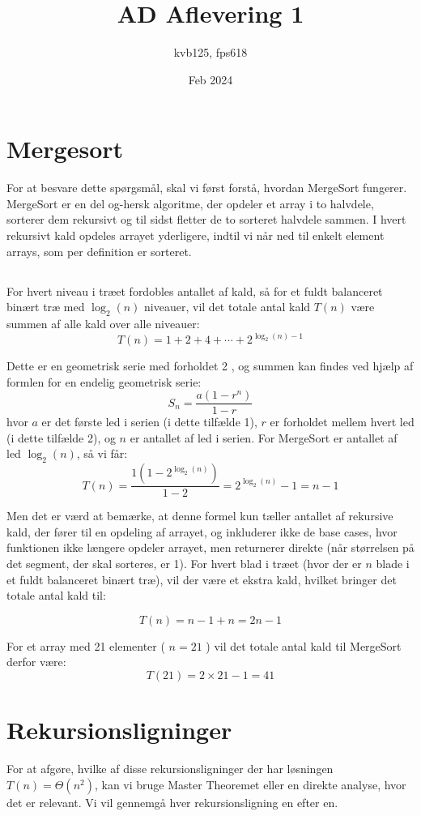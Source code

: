 \documentclass{article}
\title{AD Aflevering 1}
\author{kvb125, fps618}
\date{Feb 2024}
\begin{document}
\maketitle

\section{Mergesort}
For at besvare dette spørgsmål, skal vi først forstå, hvordan MergeSort fungerer. MergeSort er en del og-hersk algoritme, der opdeler et array i to halvdele, sorterer dem rekursivt og til sidst fletter de to sorteret halvdele sammen. I hvert rekursivt kald opdeles arrayet yderligere, indtil vi når ned til enkelt element arrays, som per definition er sorteret.

\subsection{}

For hvert niveau i træet fordobles antallet af kald, så for et fuldt balanceret binært træ med $\log _2(n)$ niveauer, vil det totale antal kald $T(n)$ være summen af alle kald over alle niveauer:
$$
T(n)=1+2+4+\cdots+2^{\log _2(n)-1}
$$

Dette er en geometrisk serie med forholdet 2 , og summen kan findes ved hjælp af formlen for en endelig geometrisk serie:
$$
S_n=\frac{a\left(1-r^n\right)}{1-r}
$$
hvor $a$ er det første led i serien (i dette tilfælde 1), $r$ er forholdet mellem hvert led (i dette tilfælde 2), og $n$ er antallet af led i serien. For MergeSort er antallet af led $\log _2(n)$, så vi får:
$$
T(n)=\frac{1\left(1-2^{\log _2(n)}\right)}{1-2}=2^{\log _2(n)}-1=n-1
$$

Men det er værd at bemærke, at denne formel kun tæller antallet af rekursive kald, der fører til en opdeling af arrayet, og inkluderer ikke de base cases, hvor funktionen ikke længere opdeler arrayet, men returnerer direkte (når størrelsen på det segment, der skal sorteres, er 1). For hvert blad i træet (hvor der er $n$ blade i et fuldt balanceret binært træ), vil der være et ekstra kald, hvilket bringer det totale antal kald til:

$$
T(n)=n-1+n=2 n-1
$$

For et array med 21 elementer ( $n=21$ ) vil det totale antal kald til MergeSort derfor være:
$$
T(21)=2 \times 21-1=41
$$

\section{Rekursionsligninger}
For at afgøre, hvilke af disse rekursionsligninger der har løsningen $T(n)=\Theta\left(n^2\right)$, kan vi bruge Master Theoremet eller en direkte analyse, hvor det er relevant. Vi vil gennemgå hver rekursionsligning en efter en.
\end{document}
